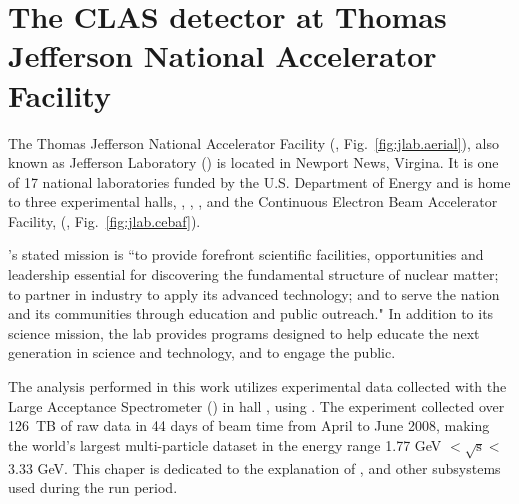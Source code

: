 \graphicspath{{/Users/Mike/phdthesis/MY_THESIS}}
\chapter{The CLAS detector at Thomas Jefferson National Accelerator Facility }\label{sec:clas}

The Thomas Jefferson National Accelerator Facility (\label{abbr:tjnaf}, Fig.~\ref{fig:jlab.aerial}), also known as Jefferson Laboratory (\label{abbr:jlab}) is located in Newport News, Virgina. It is one of 17 national laboratories funded by the U.S. Department of Energy and is home to three experimental halls, , , , and the Continuous Electron Beam Accelerator Facility,\cite{cebaf} (\label{abbr:cebaf}, Fig.~\ref{fig:jlab.cebaf}).

's stated mission is ``to provide forefront scientific facilities, opportunities and leadership essential for discovering the fundamental structure of nuclear matter; to partner in industry to apply its advanced technology; and to serve the nation and its communities through education and public outreach."\cite{Jlabwiki} In addition to its science mission, the lab provides programs designed to help educate the next generation in science and technology, and to engage the public.

The analysis performed in this work utilizes experimental data collected with the  Large Acceptance Spectrometer () in hall , using . The experiment  collected over 126~TB of raw data in 44 days of beam time from April to June 2008, making  the world's largest multi-particle dataset in the energy range 1.77 GeV $\mathrm{< \sqrt{s} <}$ 3.33 GeV. This chaper is dedicated to the explanation of ,  and other subsystems used during the  run period.


